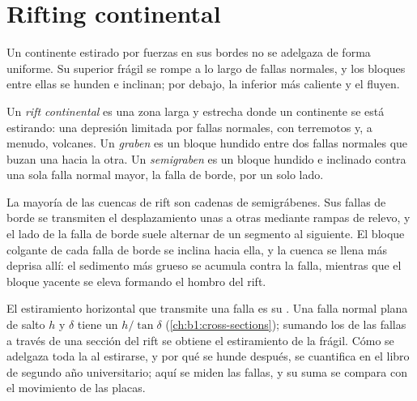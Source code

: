\section{Rifting continental}

Un continente estirado por fuerzas en sus bordes no se adelgaza de forma uniforme. Su  superior frágil se rompe a lo largo de fallas
normales, y los bloques entre ellas se hunden e inclinan; por debajo, la  inferior más caliente y el  fluyen.

\begin{definition}\label{def:b1:rifts-ridges-margins:rift}
Un \emph{rift continental} es una zona larga y estrecha donde un continente se está estirando: una depresión
limitada por fallas normales, con terremotos y, a menudo, volcanes. Un \emph{graben} es un bloque hundido entre dos fallas
normales que buzan una hacia la otra. Un \emph{semigraben} es un bloque hundido e inclinado contra una sola falla
normal mayor, la falla de borde, por un solo lado.
\end{definition}

La mayoría de las cuencas de rift son cadenas de semigrábenes. Sus fallas de borde se transmiten el desplazamiento unas a otras mediante
rampas de relevo, y el lado de la falla de borde suele alternar de un segmento al siguiente. El bloque colgante de cada falla de borde se
inclina hacia ella, y la cuenca se llena más deprisa allí: el sedimento más grueso se acumula contra la falla, mientras que el bloque
yacente se eleva formando el hombro del rift.

El estiramiento horizontal que transmite una falla es su . Una falla normal plana de salto $h$ y  $\delta$ tiene
un  $h/\tan\delta$ (\cref{ch:b1:cross-sections}); sumando los  de las fallas a través de una sección del
rift se obtiene el estiramiento de la  frágil. Cómo se adelgaza toda la  al estirarse, y por qué se hunde después, se
cuantifica en el libro de segundo año universitario; aquí se miden las fallas, y su suma se compara con el movimiento de las placas.


